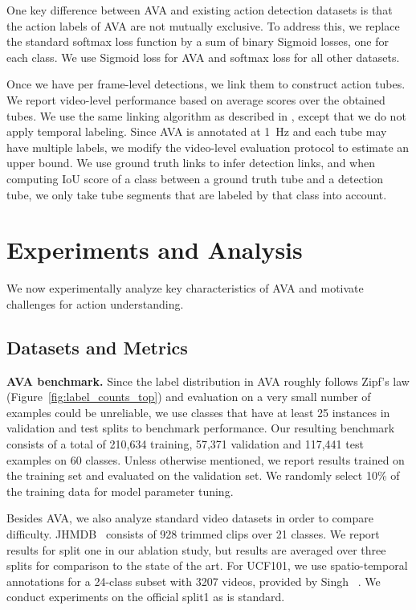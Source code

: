 \documentclass[10pt,twocolumn,letterpaper]{article}
\begin{document}
One key difference between AVA and existing action detection datasets is that the action labels of AVA are not mutually exclusive. To address this, we replace the standard softmax loss function by a sum of binary Sigmoid losses, one for each class. We use Sigmoid loss for AVA and softmax loss for all other datasets.

Once we have per frame-level detections,
we link them to construct action tubes. We report video-level performance based on average scores over the obtained tubes. We use the same linking algorithm as described in \cite{Singh_ICCV2017}, except that we do not apply temporal labeling. Since AVA is annotated at 1~Hz and each tube may have multiple labels, we modify the video-level evaluation protocol to estimate an upper bound. We use ground truth links to infer detection links, and when computing IoU score of a class between a ground truth tube and a detection tube, we only take tube segments that are labeled by that class into account.
\vspace{-0.5em}

\section{Experiments and Analysis}
\label{sec:experiments}

We now experimentally analyze key characteristics of AVA and motivate challenges for action understanding.
\vspace{-0.5em}

\subsection{Datasets and Metrics} 

\noindent \textbf{AVA benchmark.}
Since the label distribution in AVA roughly follows Zipf's law (Figure~\ref{fig:label_counts_top}) and evaluation on a very small number of examples could be unreliable, we use classes that have at least 25 instances in validation and test splits to benchmark performance. Our resulting benchmark consists of a total of 210,634 training, 57,371 validation and 117,441 test examples on 60 classes. Unless otherwise mentioned, we report results trained on the training set and evaluated on the validation set. We randomly select 10\% of the training data for model parameter tuning.

 Besides AVA, we also analyze standard video datasets in order to compare difficulty. JHMDB~\cite{jhmdb} consists of 928 trimmed clips over 21 classes. We report results for split one in our ablation study, but results are averaged over three splits for comparison to the state of the art. For UCF101, we use spatio-temporal annotations for a 24-class subset with 3207 videos, provided by Singh \etal~\cite{Singh_ICCV2017}. We conduct experiments on the official split1 as is standard.
\end{document}
